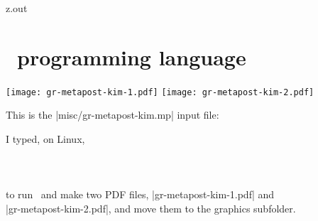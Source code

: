 \begin{VerbatimOut}{z.out}

\section{\protect\METAPOSTLogo\ programming language}
\todoindex{\METAPOSTLogo}

\todoindex{\MetaPostLogo}

\texttt{[image: gr-metapost-kim-1.pdf]}
\hspace*{0.1truein}
\texttt{[image: gr-metapost-kim-2.pdf]}

This is the |misc/gr-metapost-kim.mp| input file:

I typed, on Linux,\\
\hspace*{3\parindent}\\
\hspace*{3\parindent}\\
\hspace*{3\parindent}\\
to run \MetaPostLogo\ and
make two PDF files,
|gr-metapost-kim-1.pdf|
and\\
|gr-metapost-kim-2.pdf|,
and move them to the graphics subfolder.
\end{VerbatimOut}

\MyIO


